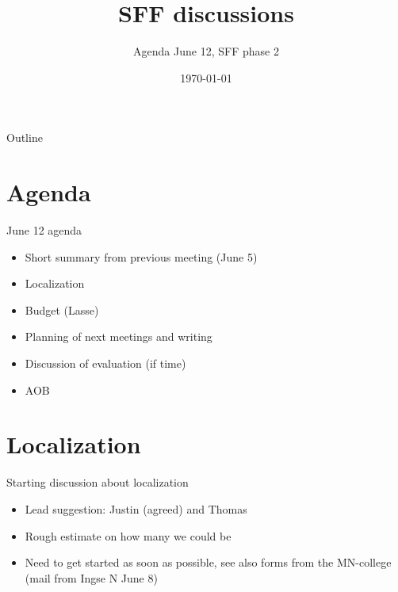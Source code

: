 \documentclass[10pt,aspectratio=169]{beamer}
\title[SFF Evaluation -- Interpretation]{SFF discussions}
\author{Agenda June 12, SFF phase 2}
\institute[UiO]{University of Oslo}
\date{\today}
\begin{document}
\begin{frame}
  \titlepage
\end{frame}

\begin{frame}{Outline}
  \tableofcontents
\end{frame}


\section{Agenda}
\begin{frame}{June 12 agenda}
  \begin{itemize}
    \item Short summary from previous meeting (June 5)
    \item Localization
    \item Budget (Lasse)
    \item Planning of next meetings and writing
    \item Discussion of evaluation (if time)
    \item AOB
  \end{itemize}
\end{frame}


\section{Localization}
\begin{frame}{Starting discussion about localization}
  \begin{itemize}
    \item Lead suggestion: Justin (agreed) and Thomas
    \item Rough estimate on how many we could be
    \item Need to get started as soon as possible, see also forms from the MN-college (mail from Ingse N June 8)
  \end{itemize}
\end{frame}
\end{document}
